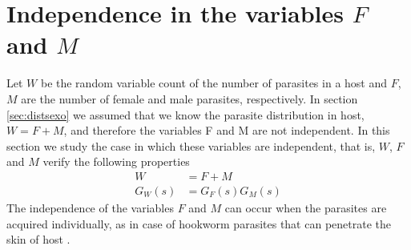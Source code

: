 \documentclass[12pt,a4paper]{article}
\theoremstyle{plain}%
\theoremstyle{definition}
\theoremstyle{remark}
\begin{document}


		
\section{Independence in the variables $F$ and $M$}\label{sec:disindep}
	Let $W$ be the random variable count of the number of parasites in a host and $F$, $M$ are the number of female and male parasites, respectively.
	In section \ref{sec:distsexo} we assumed that we know the parasite distribution in host, $W=F+M$, and therefore  the variables F and M are not independent.
	In this section we study the case in which these variables are independent, that is, $W$, $F$ and $M$ verify the following properties
	\begin{equation}\label{independencia}
	\begin{split}
	W&=F+M\\
	G_W(s)&=G_F(s)G_M(s)
	\end{split}
	\end{equation}
	The independence of the variables $F$ and $M$ can occur when the parasites are acquired individually, as in case of hookworm parasites that can penetrate the skin of host \cite{paho2022,who2022}.
\end{document}
